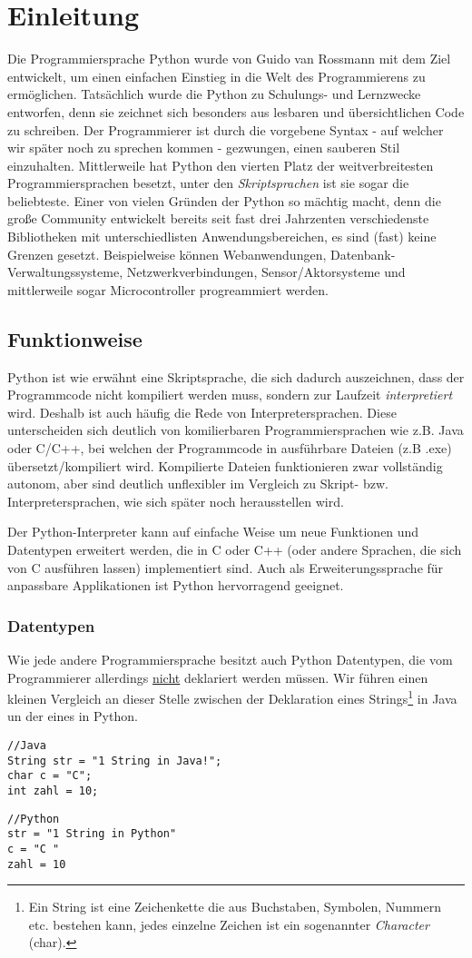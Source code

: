 \chapter{Einleitung}
Die Programmiersprache Python wurde von Guido van Rossmann mit dem Ziel entwickelt, um einen einfachen Einstieg in die Welt des Programmierens zu ermöglichen. Tatsächlich wurde die Python zu Schulungs- und Lernzwecke entworfen, denn sie zeichnet sich besonders aus lesbaren und übersichtlichen Code zu schreiben. Der Programmierer ist durch die vorgebene Syntax - auf welcher wir später noch zu sprechen kommen - gezwungen, einen sauberen Stil einzuhalten. Mittlerweile hat Python den vierten Platz der weitverbreitesten Programmiersprachen besetzt, unter den \textit{Skriptsprachen} ist sie sogar die beliebteste. Einer von vielen Gründen der Python so mächtig macht, denn die große Community entwickelt bereits seit fast drei Jahrzenten verschiedenste Bibliotheken mit unterschiedlisten Anwendungsbereichen, es sind (fast) keine Grenzen gesetzt. Beispielweise können Webanwendungen, Datenbank-Verwaltungssysteme, Netzwerkverbindungen, Sensor/Aktorsysteme und mittlerweile sogar Microcontroller progreammiert werden. 

\section{Funktionweise}
Python ist wie erwähnt eine Skriptsprache, die sich dadurch auszeichnen, dass der Programmcode nicht kompiliert werden muss, sondern zur Laufzeit \textit{interpretiert} wird. Deshalb ist auch häufig die Rede von Interpretersprachen. Diese unterscheiden sich deutlich von komilierbaren Programmiersprachen wie z.B. Java oder C/C++, bei welchen der Programmcode in ausführbare Dateien (z.B .exe) übersetzt/kompiliert wird. Kompilierte Dateien funktionieren zwar vollständig autonom, aber sind deutlich unflexibler im Vergleich zu Skript- bzw. Interpretersprachen, wie sich später noch herausstellen wird. 

Der Python-Interpreter kann auf einfache Weise um neue Funktionen und Datentypen erweitert werden, die in C oder C++ (oder andere Sprachen, die sich von C ausführen lassen) implementiert sind. Auch als Erweiterungssprache für anpassbare Applikationen ist Python hervorragend geeignet.

\subsection{Datentypen}
Wie jede andere Programmiersprache besitzt auch Python Datentypen, die vom Programmierer allerdings \underline{nicht} deklariert werden müssen. Wir führen einen kleinen Vergleich an dieser Stelle zwischen der Deklaration eines Strings\footnote{Ein String ist eine Zeichenkette die aus Buchstaben, Symbolen, Nummern etc. bestehen kann, jedes einzelne Zeichen ist ein sogenannter \textit{Character} (char).} in Java un der eines in Python.


\begin{lstlisting}
//Java
String str = "1 String in Java!";
char c = "C";
int zahl = 10;
\end{lstlisting}
\begin{lstlisting}
//Python
str = "1 String in Python"
c = "C "
zahl = 10
\end{lstlisting}